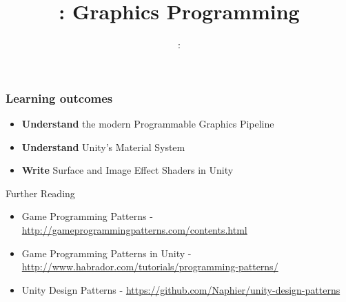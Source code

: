 \usepackage{../../beamerthemeFalmouthGamesAcademy}
\usepackage{multimedia}
\graphicspath{ {../../} }


\usepackage[normalem]{ulem}
\usepackage{wasysym}

\usepackage{pdfpages}

\usetikzlibrary{arrows,automata}




\title{\sessionnumber: Graphics Programming}
\subtitle{\modulecode: \moduletitle}

\frame{\titlepage} 

\begin{frame}
	\frametitle{Learning outcomes}
	\begin{itemize}
		\item \textbf{Understand} the modern Programmable Graphics Pipeline
		\item \textbf{Understand} Unity's Material System
		\item \textbf{Write} Surface and Image Effect Shaders in Unity
	\end{itemize}
\end{frame}






\begin{frame}{Further Reading}
	\begin{itemize}
		\item Game Programming Patterns - \url{http://gameprogrammingpatterns.com/contents.html}
		\item Game Programming Patterns in Unity - \url{http://www.habrador.com/tutorials/programming-patterns/}
		\item Unity Design Patterns - \url{https://github.com/Naphier/unity-design-patterns}
	\end{itemize}
\end{frame}

